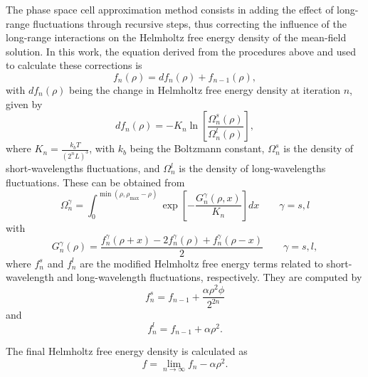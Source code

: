 \documentclass[preprint,12pt,3p]{elsarticle}
\begin{document}
The phase space cell approximation method consists in adding the effect of long-range fluctuations through recursive steps, thus correcting the influence of the long-range interactions on the Helmholtz free energy density of the mean-field solution.
In this work, the equation derived from the procedures above and used to calculate these corrections is
\begin{equation} \label{eq:fn}
f_{n}(\rho) = df_{n}(\rho) + f_{n-1}(\rho),
\end{equation}
with $df_{n}(\rho)$ being the change in Helmholtz free energy density at iteration $n$, given by
\begin{equation} \label{eq:dfn}
df_{n}(\rho) = -K_{n} \ln\left[\frac{\Omega_{n}^{s}(\rho)}{\Omega_{n}^{l}(\rho)}\right],
\end{equation}
where $K_{n} = \frac{k_{b}T}{(2^{n}L)^3}$, with $k_{b}$ being the Boltzmann constant,
$\Omega_{n}^{s}$ is the density of short-wavelengths fluctuations, and
$\Omega_{n}^{l}$ is the density of long-wavelengths fluctuations.
These can be obtained from
\begin{equation} \label{eq:Omega}
\Omega_{n}^{\gamma} = \int_{0}^{\min(\rho,\rho_{\max}-\rho)}\exp\left[-\frac{G_{n}^{\gamma}(\rho,x)}{K_{n}}\right]dx \qquad  \gamma = s,l
\end{equation}
with
\begin{equation} \label{eq:Gn}
G_{n}^{\gamma}(\rho) = \frac{f_{n}^{\gamma}(\rho+x)-2f_{n}^{\gamma}(\rho)+f_{n}^{\gamma}(\rho-x)}{2} \qquad \gamma = s,l,
\end{equation}
where $f_{n}^{s}$ and $f_{n}^{l}$ are the modified Helmholtz free energy terms related to short-wavelength and long-wavelength fluctuations, respectively.
They are computed by
\begin{equation} \label{eq:fns}
f_{n}^{s} = f_{n-1} + \frac{\alpha \rho^2 \phi}{2^{2n}}
\end{equation}
and
\begin{equation} \label{eq:fnl}
f_{n}^{l} = f_{n-1} + \alpha\rho^2.
\end{equation}

The final Helmholtz free energy density is calculated as
\begin{equation} \label{eq:ff}
f = \lim_{n \rightarrow \infty} f_{n} - \alpha\rho^2.
\end{equation}
\end{document}
